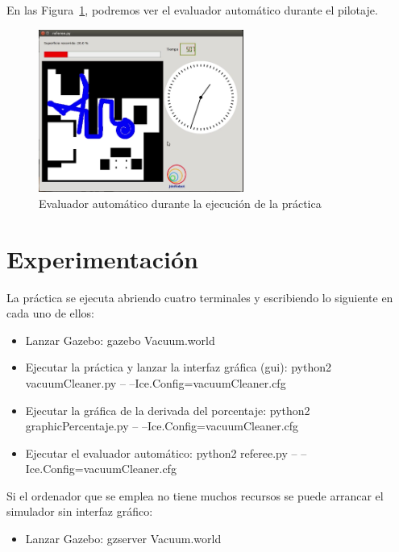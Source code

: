 En las Figura~\ref{fig.Referee_Vacuum2}, podremos ver el evaluador automático durante el pilotaje.

\begin{figure}[H]
  \begin{center}
    \includegraphics[width=0.6\textwidth]{figures/Vacuum/Referee_Vacuum2.png}
		\caption{Evaluador automático durante la ejecución de la práctica}
		\label{fig.Referee_Vacuum2}
		\end{center}
\end{figure}


\section{Experimentación}
La práctica se ejecuta abriendo cuatro terminales y escribiendo lo siguiente en cada uno de ellos:

\begin{itemize}
\item Lanzar Gazebo: gazebo Vacuum.world
\item	Ejecutar la práctica y lanzar la interfaz gráfica (\acrshort{gui}): python2 vacuumCleaner.py -- --Ice.Config=vacuumCleaner.cfg
\item	Ejecutar la gráfica de la derivada del porcentaje: python2 graphicPercentaje.py -- --Ice.Config=vacuumCleaner.cfg
\item	Ejecutar el evaluador automático: python2 referee.py -- --Ice.Config=vacuumCleaner.cfg

\end{itemize}

Si el ordenador que se emplea no tiene muchos recursos se puede arrancar el simulador sin interfaz gráfico:

\begin{itemize}
\item Lanzar Gazebo: gzserver Vacuum.world
\end{itemize}

